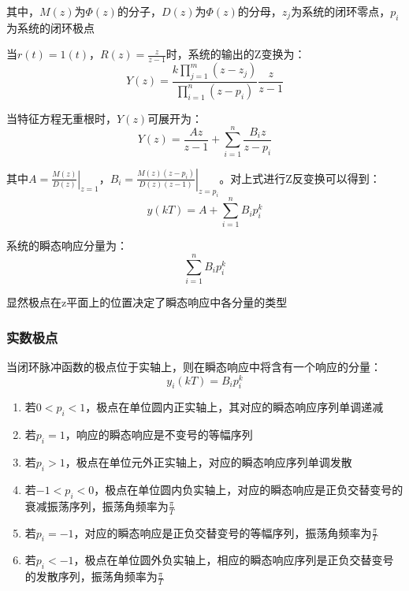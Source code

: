 其中，$M(z)$为$\Phi(z)$的分子，$D(z)$为$\Phi(z)$的分母，$z_j$为系统的闭环零点，$p_i$为系统的闭环极点

当$r(t) = 1(t)$，$R(z) = \frac{z}{z-1}$时，系统的输出的Z变换为：
\begin{equation*}
    Y(z) = \frac{k\prod\limits_{j=1}^m (z-z_j)}{\prod\limits_{i=1}^n (z-p_i)} \frac{z}{z-1}
\end{equation*}

当特征方程无重根时，$Y(z)$可展开为：
\begin{equation*}
     Y(z) = \frac{Az}{z-1} + \sum_{i=1}^n \frac{B_i z}{z - p_i}
\end{equation*}

其中$A = \left. \frac{M(z)}{D(z)} \right|_{z=1} $，$B_i = \left. \frac{M(z)(z-p_i)}{D(z)(z-1)} \right|_ {z=p_i}$。对上式进行Z反变换可以得到：
\begin{equation*}
    y(kT) = A + \sum_{i=1}^n B_i p_i ^ k
\end{equation*}

系统的瞬态响应分量为：
\begin{equation*}
    \sum_{i=1}^n B_i p_i^k
\end{equation*}

显然极点在z平面上的位置决定了瞬态响应中各分量的类型

\subsubsection{实数极点}
当闭环脉冲函数的极点位于实轴上，则在瞬态响应中将含有一个响应的分量：
\begin{equation*}
    y_i (kT) = B_i p_i^k
\end{equation*}

\begin{enumerate}
    \item 若$0< p_i <1$，极点在单位圆内正实轴上，其对应的瞬态响应序列单调递减
    \item 若$p_i = 1$，响应的瞬态响应是不变号的等幅序列
    \item 若$p_i >1$，极点在单位元外正实轴上，对应的瞬态响应序列单调发散
    \item 若$-1 < p_i <0$，极点在单位圆内负实轴上，对应的瞬态响应是正负交替变号的衰减振荡序列，振荡角频率为$\frac{\pi}{T}$
    \item 若$p_i = -1$，对应的瞬态响应是正负交替变号的等幅序列，振荡角频率为$\frac{\pi}{T}$
    \item 若$p_i < -1$，极点在单位圆外负实轴上，相应的瞬态响应序列是正负交替变号的发散序列，振荡角频率为$\frac{\pi}{T}$
\end{enumerate}

